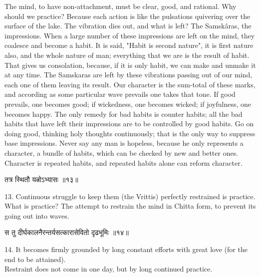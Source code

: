 The mind, to have non-attachment, must be clear, good, and
rational. Why should we practice? Because each action is like the
pulsations quivering over the surface of the lake. The vibration dies
out, and what is left? The Samskâras, the impressions. When a large
number of these impressions are left on the mind, they coalesce and
become a habit. It is said, "Habit is second nature", it is first
nature also, and the whole nature of man; everything that we are is the
result of habit. That gives us consolation, because, if it is only
habit, we can make and unmake it at any time. The Samskaras are left by
these vibrations passing out of
our mind, each one of them leaving its result. Our character is the
sum-total of these marks, and according as some particular wave
prevails one takes that tone. If good prevails, one becomes good; if
wickedness, one becomes wicked; if joyfulness, one becomes happy. The
only remedy for bad habits is counter habits; all the bad habits that
have left their impressions are to be controlled by good habits. Go on
doing good, thinking holy thoughts continuously; that is the only way
to suppress base impressions. Never say any man is hopeless, because he
only represents a character, a bundle of habits, which can be checked
by new and better ones. Character is repeated habits, and repeated
habits alone can reform character. \\

\begin{center}
\begin{sanskrit}
तत्र स्थितौ यत्नोऽभ्यासः ॥१३॥
\end{sanskrit}
\end{center}
13. Continuous struggle to keep them (the Vrittis) perfectly
restrained is practice. \\

What is practice? The attempt to restrain the mind in Chitta
form, to prevent its going out into waves. \\

\begin{center}
\begin{sanskrit}
स तु दीर्घकालनैरन्तर्यसत्कारासेवितो दृढभूमिः
॥१४॥
\end{sanskrit}
\end{center}
14. It becomes firmly grounded by long constant efforts with
great love (for the end to be attained). \\

Restraint does not come in one day, but by long continued
practice. \\


